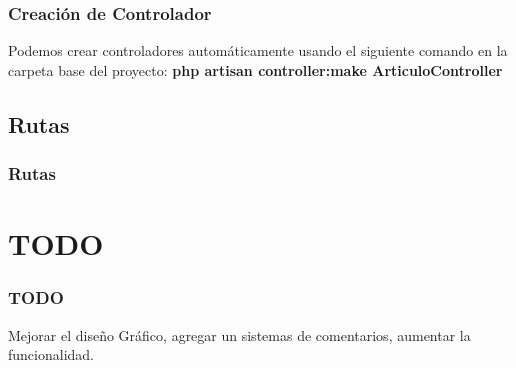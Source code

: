 \documentclass[12pt]{beamer}
\begin{document}
\begin{frame}
 \frametitle{Creación de Controlador}
 Podemos crear controladores automáticamente usando el siguiente comando en la carpeta base del proyecto:
 \newline
 {\bf php artisan controller:make ArticuloController}
\end{frame}



\subsection{Rutas}

\begin{frame}
 \frametitle{Rutas}
 
\end{frame}



\section{TODO}

\begin{frame}
 \frametitle{TODO}
 Mejorar el diseño Gráfico, agregar un sistemas de comentarios, aumentar la funcionalidad.
\end{frame}


\end{document}
